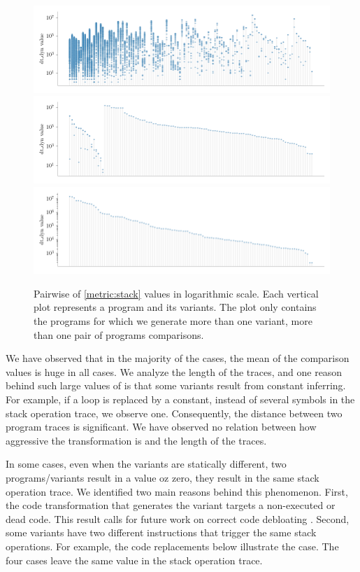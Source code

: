 \begin{figure}[h]
    \centering
    \includegraphics[width=\linewidth]{plots/plot_distribs1.png}
    \includegraphics[width=\linewidth]{plots/plot_distribs2.png}
    \includegraphics[width=\linewidth]{plots/plot_distribs3.png}
    \caption{Pairwise of \autoref{metric:stack} values in logarithmic scale. Each vertical plot represents a program and its variants. The plot only contains the programs for which we generate more than one variant, \ie more than one pair of programs comparisons. }
    \label{rq2:dtw_distrib}
\end{figure}

We have observed that in the majority of the cases, the mean of the comparison values is huge in all cases. We analyze the length of the traces, and one reason behind such large values of \DTW is that some variants result from constant inferring. For example, if a loop is replaced by a constant, instead of several symbols in the stack operation trace, we observe one. Consequently, the distance between two program traces is significant. We have observed no relation between how aggressive the transformation is and the length of the traces.  

In some cases, even when the variants are statically different, two programs/variants result in a \DTW value oz zero, \ie they result in the same stack operation trace. We identified two main reasons behind this phenomenon. First, the code transformation that generates the variant targets a non-executed or dead code. This result calls for future work on correct code debloating \citationneeded. Second, some variants have two different instructions that trigger the same stack operations. For example, the code replacements below illustrate the case. The four cases leave the same value in the stack operation trace.


